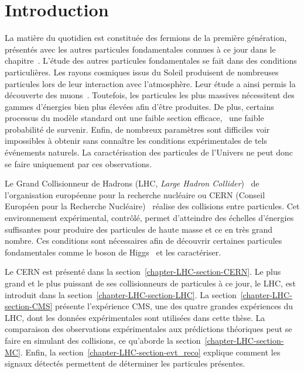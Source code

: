 \section{Introduction}\label{chapter-LHC-section-introduction}
La matière \og du quotidien \fg{} est constituée des fermions de la première génération, présentés avec les autres particules fondamentales connues à ce jour dans le chapitre~.
L'étude des autres particules fondamentales se fait dans des conditions particulières.
Les rayons cosmiques issus du Soleil produisent de nombreuses particules lors de leur interaction avec l'atmosphère.
Leur étude a ainsi permis la découverte des muons~\cite{muon_discovery}.
Toutefois, les particules les plus massives nécessitent des gammes d'énergies bien plus élevées afin d'être produites.
De plus, certains processus du modèle standard ont une faible section efficace, \ie\ une faible probabilité de survenir.
Enfin, de nombreux paramètres sont difficiles voir impossibles à obtenir sans connaître les conditions expérimentales de tels événements naturels.
La caractérisation des particules de l'Univers ne peut donc se faire uniquement par ces observations.
\par Le Grand Collisionneur de Hadrons (LHC, \emph{Large Hadron Collider})~\cite{LHC_paper1,LHC_paper2,LHC_paper3} de l'organisation européenne pour la recherche nucléaire ou CERN (Conseil Européen pour la Recherche Nucléaire)~\cite{CERN_website} réalise des collisions entre particules.
Cet environnement expérimental, contrôlé, permet d'atteindre des échelles d'énergies suffisantes pour produire des particules de haute masse et ce en très grand nombre.
Ces conditions sont nécessaires afin de découvrir certaines particules fondamentales comme le boson de Higgs~\cite{ATLAS_Higgs_discovery,CMS_Higgs_discovery,CMS_Higgs_discovery_2013,ATLAS-CMS-Higgs_combined_1,ATLAS-CMS-Higgs_combined_2} et les caractériser.
\par Le CERN est présenté dans la section~\ref{chapter-LHC-section-CERN}.
Le plus grand et le plus puissant de ses collisionneurs de particules à ce jour, le LHC, est introduit dans la section~\ref{chapter-LHC-section-LHC}.
La section~\ref{chapter-LHC-section-CMS} présente l'expérience CMS, une des quatre grandes expériences du LHC, dont les données expérimentales sont utilisées dans cette thèse.
La comparaison des observations expérimentales aux prédictions théoriques peut se faire en simulant des collisions, ce qu'aborde la section~\ref{chapter-LHC-section-MC}.
Enfin, la section~\ref{chapter-LHC-section-evt_reco} explique comment les signaux détectés permettent de déterminer les particules présentes.